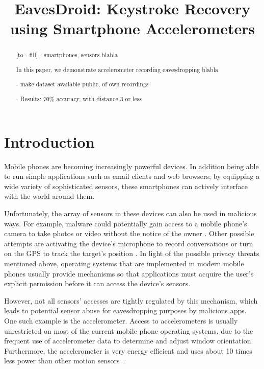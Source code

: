 \documentclass[11pt,conference]{IEEEtran}
\begin{document}
\title{EavesDroid: Keystroke Recovery using Smartphone Accelerometers}

\author{
}

\maketitle

\begin{abstract}
[to - fill]
- smartphones, sensors blabla

In this paper, we demonstrate accelerometer recording eavesdropping blabla

- make dataset available public, of own recordings

- Results: 70\% accuracy, with distance 3 or less

\end{abstract}
\IEEEpeerreviewmaketitle

\section{Introduction}
\label{sec:introduction}
\noindent Mobile phones are becoming increasingly powerful
devices. In addition being able to run simple applications such as email clients and web browsers; by equipping a wide variety of sophisticated sensors, these smartphones can actively interface with the world around them.

\noindent Unfortunately, the array of sensors in these devices can also be
used in malicious ways. For example, malware could
potentially gain access to a mobile phone's camera to take photos or
video without the notice of the owner \cite{cheng2007mobile}. Other possible attempts are activating the device's microphone to record conversations or turn on the GPS to track the target's position
\cite{dagon2004mobile, cai2009defending, enck2010taintdroid, egele2011pios}.
In light of the possible privacy threats mentioned above, operating systems that are implemented in modern mobile phones usually provide mechanisms so that applications must acquire the user's explicit permission before it can access the device's sensors.

\noindent However, not all sensors' accesses are tightly regulated by this mechanism, which leads to potential sensor abuse for eavesdropping purposes by malicious apps.
One such example is the accelerometer. Access to accelerometers is usually unrestricted on most of the current mobile phone operating systems, due to the frequent use of accelerometer data to determine and adjust window orientation. Furthermore, the accelerometer is very energy efficient and uses about 10 times less power than other motion sensors~\cite{accelerometer-energy}.
\end{document}
